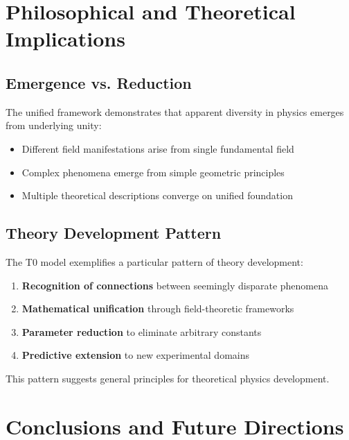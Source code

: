 \documentclass[12pt,a4paper]{article}
\begin{document}
	\section{Philosophical and Theoretical Implications}
	\label{sec:philosophical_implications}
	
	\subsection{Emergence vs. Reduction}
	\label{subsec:emergence_reduction}
	
	The unified framework demonstrates that apparent diversity in physics emerges from underlying unity:
	
	\begin{itemize}
		\item Different field manifestations arise from single fundamental field
		\item Complex phenomena emerge from simple geometric principles
		\item Multiple theoretical descriptions converge on unified foundation
	\end{itemize}
	
	\subsection{Theory Development Pattern}
	\label{subsec:theory_development}
	
	The T0 model exemplifies a particular pattern of theory development:
	
	\begin{enumerate}
		\item \textbf{Recognition of connections} between seemingly disparate phenomena
		\item \textbf{Mathematical unification} through field-theoretic frameworks
		\item \textbf{Parameter reduction} to eliminate arbitrary constants
		\item \textbf{Predictive extension} to new experimental domains
	\end{enumerate}
	
	This pattern suggests general principles for theoretical physics development.
	
	\section{Conclusions and Future Directions}
	\label{sec:conclusions}
	
\end{document}

